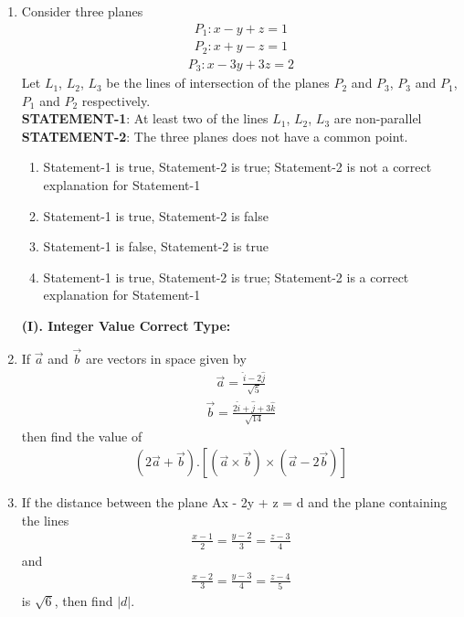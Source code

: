 \begin{enumerate}[label=\arabic*.,ref=\thesubsection.\theenumi]
\item Consider three planes
\begin{align*}
P_1: x - y + z = 1
\end{align*}
\begin{align*}
P_2: x + y - z = 1
\end{align*}
\begin{align*}
P_3: x - 3y + 3z = 2
\end{align*}
Let $L_1$, $L_2$, $L_3$ be the lines of intersection of the planes $P_2$ and $P_3$, $P_3$ and $P_1$, $P_1$ and $P_2$ respectively.\\
\textbf{STATEMENT-1}: At least two of the lines $L_1$, $L_2$, $L_3$ are non-parallel\\
\textbf{STATEMENT-2}: The three planes does not have a common point.
\begin{enumerate}
\item Statement-1 is true, Statement-2 is true; Statement-2 is not a correct explanation for Statement-1
\item Statement-1 is true, Statement-2 is false
\item Statement-1 is false, Statement-2 is true
\item Statement-1 is true, Statement-2 is true; Statement-2 is a correct explanation for Statement-1
\end{enumerate}
 
\textbf{(I). Integer Value Correct Type:}

\item If $\overrightarrow{a}$ and $\overrightarrow{b}$ are vectors in space given by 
\begin{align*}
\overrightarrow{a} = \frac{\hat{i} - 2\hat{j}}{\sqrt{5}}
\end{align*}
\begin{align*}
\overrightarrow{b} = \frac{2\hat{i} + \hat{j} + 3\hat{k}}{\sqrt{14}}
\end{align*}
then find the value of 
\begin{align*}
(2\overrightarrow{a} + \overrightarrow{b}).[(\overrightarrow{a} \times \overrightarrow{b}) \times (\overrightarrow{a} - 2\overrightarrow{b})]
\end{align*}

\item If the distance between the plane Ax - 2y + z = d and the plane containing the lines
\begin{align*}
\frac{x-1}{2} = \frac{y-2}{3} = \frac{z-3}{4}
\end{align*}
and
\begin{align*}
\frac{x-2}{3} = \frac{y-3}{4} = \frac{z-4}{5}
\end{align*}
is $\sqrt{6}$, then find $|d|$.


\end{enumerate}
